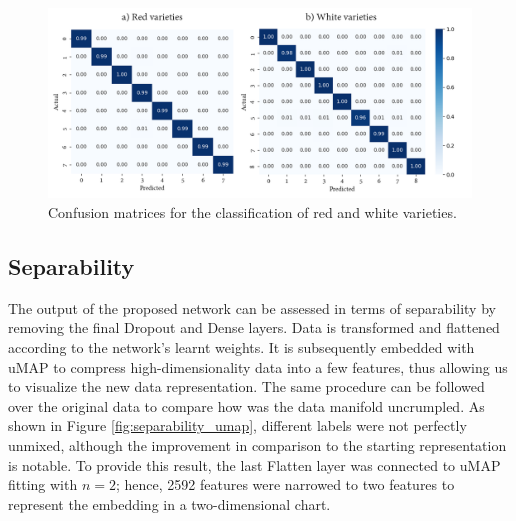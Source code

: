 \begin{figure}[ht]
    \centering
    \includegraphics[width=\linewidth]{figs/vineyard_classification/confusion_matrices.png}
	\caption{Confusion matrices for the classification of red and white varieties. }
	\label{fig:confusion_matrices}
\end{figure}

\subsection{Separability}

The output of the proposed network can be assessed in terms of separability by removing the final Dropout and Dense layers. Data is transformed and flattened according to the network's learnt weights. It is subsequently embedded with uMAP \cite{mcinnes_umap_2020} to compress high-dimensionality data into a few features, thus allowing us to visualize the new data representation. The same procedure can be followed over the original data to compare how was the data manifold uncrumpled. As shown in Figure \ref{fig:separability_umap}, different labels were not perfectly unmixed, although the improvement in comparison to the starting representation is notable. To provide this result, the last Flatten layer was connected to uMAP fitting with $n = 2$; hence, 2592 features were narrowed to two features to represent the embedding in a two-dimensional chart. 

